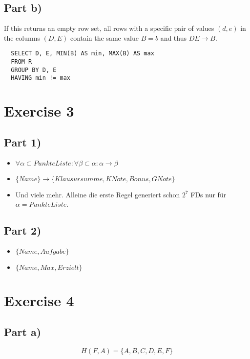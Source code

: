 \documentclass[10pt,a4paper]{article}
\begin{document}
\subsection*{Part b)}

If this returns an empty row set, all rows with a specific pair of values $(d, e)$ in the columns $(D, E)$ contain the same value $B = b$ and thus $DE \rightarrow B$.
\begin{verbatim}
  SELECT D, E, MIN(B) AS min, MAX(B) AS max
  FROM R
  GROUP BY D, E
  HAVING min != max
\end{verbatim}

\section*{Exercise 3}

\subsection*{Part 1)}

\begin{itemize}
\item $\forall \alpha \subset PunkteListe : \forall \beta \subset \alpha : \alpha \rightarrow \beta$
\item $\{ Name \} \rightarrow \{ Klausursumme, KNote, Bonus, GNote \}$
\item Und viele mehr. Alleine die erste Regel generiert schon $2^{7}$ FDs nur für $\alpha = PunkteListe$.
\end{itemize}

\subsection*{Part 2)}

\begin{itemize}
\item $\{ Name, Aufgabe \}$
\item $\{ Name, Max, Erzielt \}$
\end{itemize}

\section*{Exercise 4}

\subsection*{Part a)}

\begin{equation*}
  H(F, A) = \{ A, B, C, D, E, F \}
\end{equation*}
\end{document}
